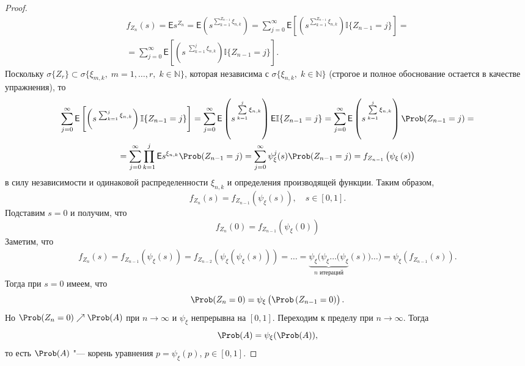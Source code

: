 \documentclass[a4paper]{article}
\newcommand{\Expect}{\mathsf{E}}
\newcommand{\ind}{\mathbb I}
\theoremstyle{plain}
\theoremstyle{definition}
\theoremstyle{remark}
\theoremstyle{nonumberplain}
\newtheorem{proof}{Доказательство}
\theoremstyle{nonumberplain}
\begin{document}
\begin{proof}

  \begin{multline*}
    f_{Z_{n}}(s) = \Expect s^{Z_{n}} = \Expect \left(s^{\sum_{k=1}^{Z_{n-1}} \xi_{n, k}}\right)
    = \sum_{j=0}^{\infty} \Expect \left[ \left( s^{\sum_{k=1}^{Z_{n-1}} \xi_{n, k}} \right)  \ind \lbrace Z_{n-1} = j \rbrace \right] = \\ = \sum_{j=0}^{\infty} \Expect \left[ \left( s \: ^{\sum_{k=1}^{j} \xi_{n, k}} \right)  \ind \lbrace Z_{n-1} = j \rbrace \right].
  \end{multline*}
  Поскольку $\sigma \lbrace Z_{r} \rbrace \subset \sigma \lbrace \xi_{m, k}, \; m = 1, \ldots, r, \; k \in \mathbb{N} \rbrace$, которая независима с $\sigma \lbrace \xi_{n, k}, \; k \in \mathbb{N} \rbrace$ (строгое и полное обоснование остается в качестве упражнения), то
  \begin{multline*}
    \sum_{j=0}^{\infty} \Expect \left[ \left( s \: ^{\sum_{k=1}^{j} \xi_{n, k}} \right)  \ind \lbrace Z_{n-1} = j \rbrace \right]  =  \sum\limits_{j=0}^{\infty} \Expect \left(s \: ^{\sum\limits_{k=1}^{j} \xi_{n, k}}\right) \Expect \ind \lbrace Z_{n-1} = j \rbrace   = \sum\limits_{j=0}^{\infty} \Expect \left(s \: ^{\sum\limits_{k=1}^{j} \xi_{n, k}}\right) \Prob ( Z_{n-1} = j ) = \\ = \sum\limits_{j=0}^{\infty} \prod\limits_{k=1}^{j} \Expect s^{\xi_{n, k}} \Prob (Z_{n-1} = j)  = \sum\limits_{j=0}^{\infty} \psi_{\xi}^{j} (s) \Prob (Z_{n-1} = j)  =  f_{Z_{n-1}} \left(\psi_{\xi} \left(s \right) \right)
  \end{multline*}
  в силу независимости и одинаковой распределенности $\xi_{n, k}$ и определения производящей функции. Таким образом,
  \begin{equation*}
    f_{Z_{n}} (s) = f_{Z_{n-1}} \left( \psi_{\xi} \left(s \right)\right){,}\quad s \in [0, 1]{.}
  \end{equation*}
  Подставим $s = 0$ и получим, что
  \begin{equation*}
    f_{Z_{n}} (0) = f_{Z_{n-1}} \left( \psi_{\xi} \left(0 \right)\right)
  \end{equation*}
  Заметим, что
  \begin{multline*}
    f_{Z_{n}}(s) = f_{Z_{n-1}}(\psi_{\xi}(s)) = f_{Z_{n-2}} \left(\psi_{\xi} \left( \psi_{\xi} \left(s \right) \right) \right) = \ldots = \underbrace{\psi_{\xi} (\psi_{\xi} \ldots (\psi_{\xi}}_{\text{$n$ итераций}}(s)) \ldots ) = \psi_{\xi} (f_{Z_{n-1}} (s)){.}
  \end{multline*}
  Тогда при $s = 0$ имеем, что
  \begin{equation*}
    \Prob (Z_{n} = 0) = \psi_{\xi} \left( \Prob\left(Z_{n-1}=0 \right) \right) {.}
  \end{equation*}
  Но $\Prob(Z_{n} = 0) \nearrow \Prob(A)$ при $n \to \infty$ и $\psi_{\xi}$ непрерывна на $[0, 1]$.
  Переходим к пределу при $n \to \infty$. Тогда
  \begin{equation*}
    \Prob(A) = \psi_{\xi} (\Prob(A)){,}
  \end{equation*}
  то есть $\Prob(A)$ "--- корень уравнения $p = \psi_{\xi}(p)$, $p \in [0, 1]$.
\end{proof}
\end{document}
